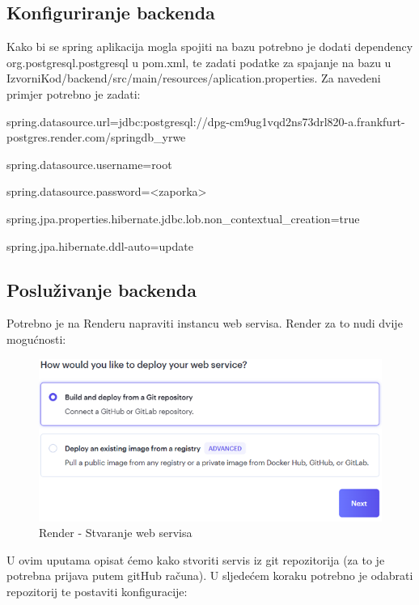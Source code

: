 \subsection{Konfiguriranje backenda}

Kako bi se spring aplikacija mogla spojiti na bazu potrebno je dodati 
dependency org.postgresql.postgresql u pom.xml, te zadati podatke za spajanje 
na bazu u IzvorniKod/backend/src/main/resources/aplication.properties. Za 
navedeni primjer potrebno je zadati:

spring.datasource.url=jdbc:postgresql://dpg-cm9ug1vqd2ns73drl820-a.frankfurt-postgres.render.com/springdb_yrwe

spring.datasource.username=root

spring.datasource.password=<zaporka>

spring.jpa.properties.hibernate.jdbc.lob.non_contextual_creation=true

spring.jpa.hibernate.ddl-auto=update

\subsection{Posluživanje backenda}

Potrebno je na Renderu napraviti instancu web servisa. Render za to nudi dvije 
mogućnosti:

\begin{figure}[H]
	\includegraphics[scale=0.4]{slike/render_backend.png}
	\centering
	\caption{Render - Stvaranje web servisa}
	\label{fig:render_backend1}
\end{figure}

U ovim uputama opisat ćemo kako stvoriti servis iz git repozitorija (za to je 
potrebna prijava putem gitHub računa). U sljedećem koraku potrebno je odabrati 
repozitorij te postaviti konfiguracije:

